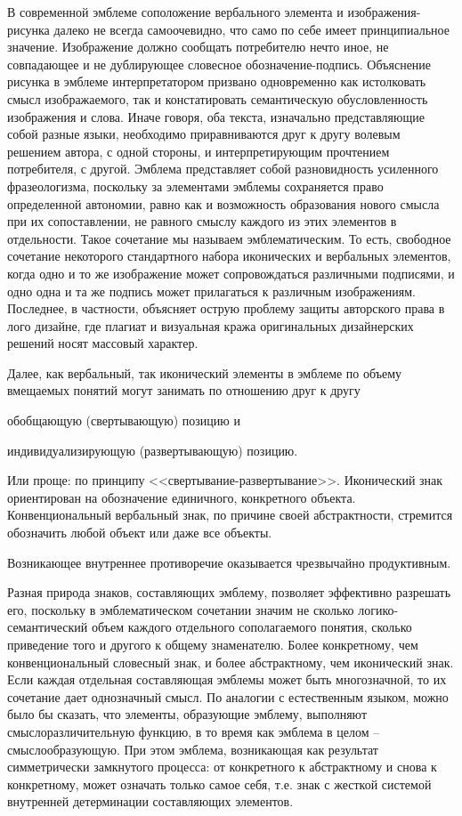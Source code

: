 В современной эмблеме соположение вербального элемента и изображения\hyp{}рисунка далеко не всегда
самоочевидно, что само по себе имеет принципиальное значение. Изображение должно сообщать
потребителю нечто иное, не совпадающее и не дублирующее словесное обозначение-подпись. Объяснение
рисунка в эмблеме интерпретатором призвано одновременно как истолковать смысл изображаемого, так и
констатировать семантическую обусловленность изображения и слова. Иначе говоря, оба текста,
изначально представляющие собой разные языки, необходимо приравниваются друг к другу волевым
решением автора, с одной стороны, и интерпретирующим прочтением потребителя, с другой. Эмблема
представляет собой разновидность усиленного фразеологизма,  поскольку за элементами эмблемы
сохраняется право определенной автономии, равно как и возможность образования нового смысла при их
сопоставлении, не равного смыслу каждого из этих элементов в отдельности. Такое сочетание мы
называем эмблематическим. То есть, свободное сочетание некоторого стандартного набора иконических
и вербальных элементов, когда одно и то же изображение может сопровождаться различными подписями, и
одно одна и та же подпись может прилагаться к различным изображениям. Последнее, в частности,
объясняет острую проблему защиты авторского права в лого дизайне, где плагиат и визуальная кража
оригинальных дизайнерских решений носят массовый характер.

Далее, как вербальный, так иконический элементы в эмблеме по объему вмещаемых понятий могут занимать
по отношению друг к другу
\begin{enumerate*}[label=\asbuk*)]
\item обобщающую (свертывающую) позицию и
\item индивидуализирующую (развертывающую) позицию.
\end{enumerate*}
Или проще: по принципу <<свертывание-развертывание>>.  Иконический знак
ориентирован на обозначение единичного, конкретного объекта. Конвенциональный вербальный знак, по
причине своей абстрактности, стремится обозначить любой объект или даже все объекты.

Возникающее внутреннее противоречие оказывается чрезвычайно продуктивным.

Разная природа знаков, составляющих эмблему, позволяет эффективно разрешать его, поскольку в
эмблематическом сочетании значим не сколько логико-семантический объем каждого отдельного
сополагаемого понятия, сколько приведение того и другого к общему знаменателю. Более конкретному,
чем конвенциональный словесный знак, и более абстрактному, чем иконический знак. Если каждая
отдельная составляющая эмблемы может быть многозначной, то их сочетание дает однозначный смысл. По
аналогии с естественным языком, можно было бы сказать, что элементы, образующие эмблему, выполняют
смыслоразличительную функцию, в то время как эмблема в целом -- смыслообразующую. При этом эмблема,
возникающая как результат симметрически замкнутого процесса: от конкретного к абстрактному и снова к
конкретному, может означать только самое себя, т.е. знак с жесткой системой внутренней детерминации
составляющих элементов.

